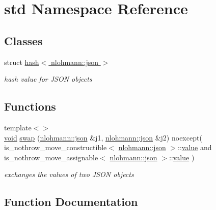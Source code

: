 \hypertarget{namespacestd}{}\section{std Namespace Reference}
\label{namespacestd}
\subsection*{Classes}
\begin{DoxyCompactItemize}
\item 
struct \hyperlink{structstd_1_1hash_3_01nlohmann_1_1json_01_4}{hash$<$ nlohmann\+::json $>$}
\begin{DoxyCompactList}\small\item\em hash value for J\+S\+ON objects \end{DoxyCompactList}\end{DoxyCompactItemize}
\subsection*{Functions}
\begin{DoxyCompactItemize}
\item 
{\footnotesize template$<$$>$ }\\\hyperlink{tk_8h_aba408b7cd755a96426e004c015f5de8e}{void} \hyperlink{namespacestd_ac944003a5eb4335bbef8da6915848a22}{swap} (\hyperlink{namespacenlohmann_a2bfd99e845a2e5cd90aeaf1b1431f474}{nlohmann\+::json} \&j1, \hyperlink{namespacenlohmann_a2bfd99e845a2e5cd90aeaf1b1431f474}{nlohmann\+::json} \&j2) noexcept(                                                                           is\+\_\+nothrow\+\_\+move\+\_\+constructible$<$ \hyperlink{namespacenlohmann_a2bfd99e845a2e5cd90aeaf1b1431f474}{nlohmann\+::json} $>$\+::\hyperlink{tk_8h_a177a0765f574ef6642002696d9cd82d0}{value} and                                                                           is\+\_\+nothrow\+\_\+move\+\_\+assignable$<$ \hyperlink{namespacenlohmann_a2bfd99e845a2e5cd90aeaf1b1431f474}{nlohmann\+::json} $>$\+::\hyperlink{tk_8h_a177a0765f574ef6642002696d9cd82d0}{value}                                                           )
\begin{DoxyCompactList}\small\item\em exchanges the values of two J\+S\+ON objects \end{DoxyCompactList}\end{DoxyCompactItemize}


\subsection{Function Documentation}
